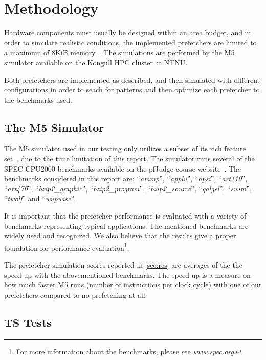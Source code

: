 \section{Methodology}

Hardware components must usually be designed within an area budget, and in order
to simulate realistic conditions, the implemented prefetchers are limited to a
maximum of 8KiB memory~\cite{guidelines}. The simulations are performed by the
M5 simulator available on the Kongull HPC cluster at NTNU.

Both prefetchers are implemented as described, and then simulated with different
configurations in order to seach for patterns and then optimize each prefetcher
to the benchmarks used.

\subsection{The M5 Simulator}
The M5 simulator used in our testing only utilizes a subset of its rich
feature set~\cite{user_doc}, due to the time limitation of this report. The simulator runs several of the SPEC CPU2000 benchmarks available on the
pfJudge course website~\cite{guidelines}. The benchmarks considered in this
report are; ``\emph{ammp}'', ``\emph{applu}'', ``\emph{apsi}'',
``\emph{art110}'', ``\emph{art470}'', ``\emph{bzip2\_graphic}'',
``\emph{bzip2\_program}'', ``\emph{bzip2\_source}'', ``\emph{galgel}'',
``\emph{swim}'', ``\emph{twolf}'' and ``\emph{wupwise}''.

It is important that the prefetcher performance is evaluated with a variety of
benchmarks representing typical applications. The mentioned benchmarks are
widely used and recognized. We also believe that the results give a proper
foundation for performance evaluation\footnote{For more information about the
benchmarks, please see \emph{www.spec.org}.}.

The prefetcher simulation scores reported in \ref{sec:res} are averages of the
the speed-up with the abovementioned benchmarks. The speed-up is a measure on how
much faster M5 runs (number of instructions per clock cycle) with one of our
prefetchers compared to no prefetching at all.


\subsection{TS Tests}

